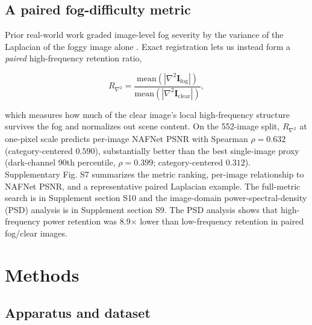 \documentclass{optica-article}
\begin{document}
\subsection{A paired fog-difficulty metric}
\label{subsec:fogdifficulty}
 
Prior real-world work graded image-level fog severity by the variance of the
Laplacian of the foggy image alone \cite{pollak2024stereofog}.
Exact registration lets us instead form a \emph{paired}
high-frequency retention ratio,
 
\begin{equation}
  R_{\nabla^2} =
    \frac{\mathrm{mean}\!\left(|\nabla^2 \mathbf{I}_{\mathrm{fog}}|\right)}
         {\mathrm{mean}\!\left(|\nabla^2 \mathbf{I}_{\mathrm{clear}}|\right)},
  \label{eq:laplacian_ratio}
\end{equation}
 
\noindent which measures how much of the clear image's local
high-frequency structure survives the fog and normalizes out scene
content. On the 552-image split, $R_{\nabla^2}$ at one-pixel scale
predicts per-image NAFNet PSNR with Spearman $\rho = 0.632$
(category-centered $0.590$), substantially better than the best
single-image proxy (dark-channel 90th percentile, $\rho = 0.399$;
category-centered $0.312$). Supplementary Fig. S7 summarizes the metric ranking, per-image relationship to NAFNet PSNR, and a representative paired Laplacian example. The full-metric search is in Supplement section S10 and the image-domain power-spectral-density (PSD) analysis is in Supplement section S9. The PSD analysis shows that high-frequency power retention was 8.9$\times$ lower than low-frequency retention in paired fog/clear images. 
 
\section{Methods}
\label{sec:methods}
 
\subsection{Apparatus and dataset}
\label{subsec:apparatus}
 
\end{document}
